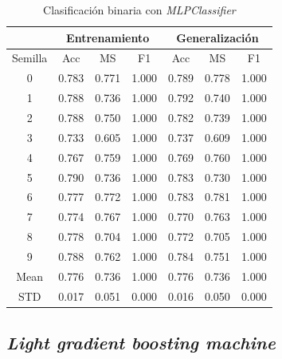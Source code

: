 \begin{table}[H]
	\centering
	\begin{tabular}{ |c|c|c|c|c|c|c| }
		\hline
		\rowcolor{LightCyan}
		 & \multicolumn{3}{c|}{Entrenamiento} & \multicolumn{3}{c|}{Generalización} \\
		\hline
		\rowcolor{LightCyan}
		 Semilla & Acc & MS & F1 & Acc & MS & F1 \\
		\hline
		0 & 0.783 & 0.771 & 1.000 & 0.789 & 0.778 & 1.000 \\
		1 & 0.788 & 0.736 & 1.000 & 0.792 & 0.740 & 1.000 \\
		2 & 0.788 & 0.750 & 1.000 & 0.782 & 0.739 & 1.000 \\
		3 & 0.733 & 0.605 & 1.000 & 0.737 & 0.609 & 1.000 \\
		4 & 0.767 & 0.759 & 1.000 & 0.769 & 0.760 & 1.000 \\
		5 & 0.790 & 0.736 & 1.000 & 0.783 & 0.730 & 1.000 \\
		6 & 0.777 & 0.772 & 1.000 & 0.783 & 0.781 & 1.000 \\
		7 & 0.774 & 0.767 & 1.000 & 0.770 & 0.763 & 1.000 \\
		8 & 0.778 & 0.704 & 1.000 & 0.772 & 0.705 & 1.000 \\
		9 & 0.788 & 0.762 & 1.000 & 0.784 & 0.751 & 1.000 \\
		Mean & 0.776 & 0.736 & 1.000 & 0.776 & 0.736 & 1.000 \\
		STD & 0.017 & 0.051 & 0.000 & 0.016 & 0.050 & 0.000 \\
		\hline
	\end{tabular}
	\caption{Clasificación binaria con \textit{MLPClassifier}}
	\label{tabla:mlp_bin}
\end{table}


\subsection{\textit{Light gradient boosting machine}}
\label{subsec:lgbm_bin}

